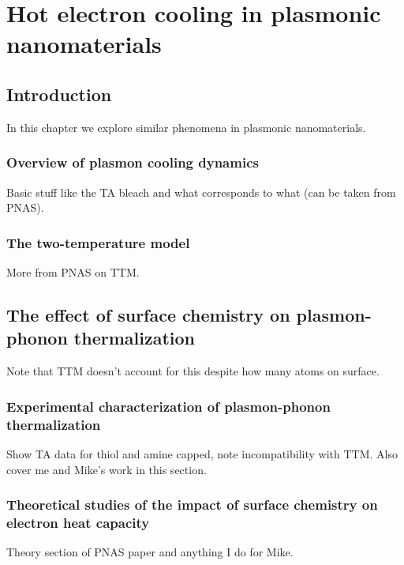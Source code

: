 \chapter{Hot electron cooling in plasmonic nanomaterials}

\section{Introduction}

	In this chapter we explore similar phenomena in plasmonic nanomaterials.

\subsection{Overview of plasmon cooling dynamics}

	Basic stuff like the TA bleach and what corresponds to what (can be taken from PNAS).

\subsection{The two-temperature model}

	More from PNAS on TTM.

\section{The effect of surface chemistry on plasmon-phonon thermalization}

	Note that TTM doesn't account for this despite how many atoms on surface.

\subsection{Experimental characterization of plasmon-phonon thermalization}

	Show TA data for thiol and amine capped, note incompatibility with TTM.  Also cover me and Mike's work in this section.

\subsection{Theoretical studies of the impact of surface chemistry on electron heat capacity}

	Theory section of PNAS paper and anything I do for Mike.